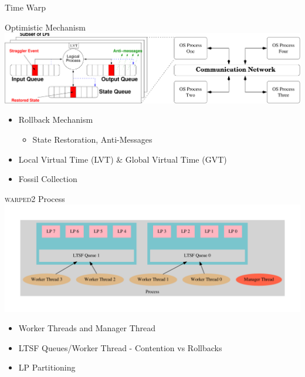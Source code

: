 \documentclass[10pt]{beamer}
\begin{document}
\begin{frame}{Time Warp}
    \begin{block}{Optimistic Mechanism}
        \bigskip
        \includegraphics[width=\textwidth]{../figs/timeWarp.pdf}
        \bigskip
        \begin{itemize}
            \item Rollback Mechanism
                \begin{itemize}
                    \item State Restoration, Anti-Messages
                \end{itemize}
            \item Local Virtual Time (LVT) \& Global Virtual Time (GVT)
            \item Fossil Collection
        \end{itemize}
    \end{block}
\end{frame}

\begin{frame}{\textsc{warped2} Process}
        \includegraphics[width=\textwidth]{../figs/graphviz/partitioning.pdf}
        \begin{itemize}
            \item Worker Threads and Manager Thread
            \item LTSF Queues/Worker Thread - Contention vs Rollbacks
            \item LP Partitioning
        \end{itemize}
\end{frame}
\end{document}
